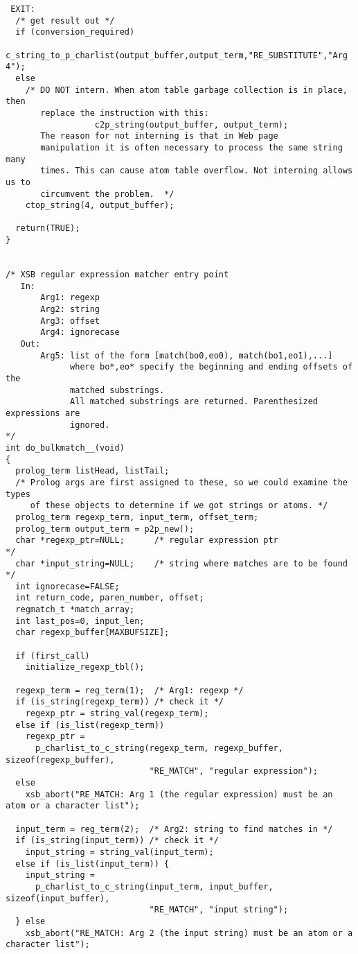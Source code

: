 \begin{verbatim}
 EXIT:
  /* get result out */
  if (conversion_required)
    c_string_to_p_charlist(output_buffer,output_term,"RE_SUBSTITUTE","Arg 4");
  else
    /* DO NOT intern. When atom table garbage collection is in place, then
       replace the instruction with this:
                  c2p_string(output_buffer, output_term);
       The reason for not interning is that in Web page
       manipulation it is often necessary to process the same string many
       times. This can cause atom table overflow. Not interning allows us to
       circumvent the problem.  */
    ctop_string(4, output_buffer);
  
  return(TRUE);
}


/* XSB regular expression matcher entry point
   In:
       Arg1: regexp
       Arg2: string
       Arg3: offset
       Arg4: ignorecase
   Out:
       Arg5: list of the form [match(bo0,eo0), match(bo1,eo1),...]
             where bo*,eo* specify the beginning and ending offsets of the
             matched substrings.
             All matched substrings are returned. Parenthesized expressions are
             ignored.
*/
int do_bulkmatch__(void)
{
  prolog_term listHead, listTail;
  /* Prolog args are first assigned to these, so we could examine the types
     of these objects to determine if we got strings or atoms. */
  prolog_term regexp_term, input_term, offset_term;
  prolog_term output_term = p2p_new();
  char *regexp_ptr=NULL;      /* regular expression ptr               */
  char *input_string=NULL;    /* string where matches are to be found */
  int ignorecase=FALSE;
  int return_code, paren_number, offset;
  regmatch_t *match_array;
  int last_pos=0, input_len;
  char regexp_buffer[MAXBUFSIZE];

  if (first_call)
    initialize_regexp_tbl();

  regexp_term = reg_term(1);  /* Arg1: regexp */
  if (is_string(regexp_term)) /* check it */
    regexp_ptr = string_val(regexp_term);
  else if (is_list(regexp_term))
    regexp_ptr =
      p_charlist_to_c_string(regexp_term, regexp_buffer, sizeof(regexp_buffer),
                             "RE_MATCH", "regular expression");
  else
    xsb_abort("RE_MATCH: Arg 1 (the regular expression) must be an atom or a character list");

  input_term = reg_term(2);  /* Arg2: string to find matches in */
  if (is_string(input_term)) /* check it */
    input_string = string_val(input_term);
  else if (is_list(input_term)) {
    input_string =
      p_charlist_to_c_string(input_term, input_buffer, sizeof(input_buffer),
                             "RE_MATCH", "input string");
  } else
    xsb_abort("RE_MATCH: Arg 2 (the input string) must be an atom or a character list");


\end{verbatim}
